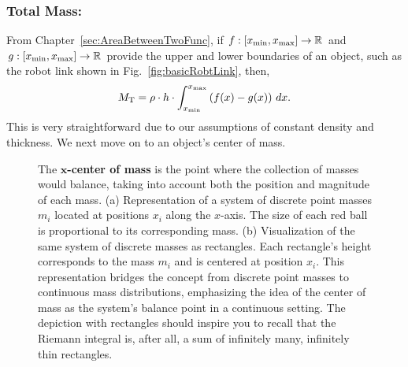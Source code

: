 \subsubsection{Total Mass:} From Chapter~\ref{sec:AreaBetweenTwoFunc}, if $f:[x_{\rm min}, x_{\rm max}] \to \mathbb R$ and $g:[x_{\rm min}, x_{\rm max}] \to \mathbb R$ provide the upper and lower boundaries of an object, such as the robot link shown in Fig.~\ref{fig:basicRobtLink}, then, 
\begin{equation}
    M_{\rm T} = \rho \cdot h \cdot \int_{x_{\rm min}}^{x_{\rm max}} \left(f(x) - g(x) \right)\, dx.
\end{equation}
This is very straightforward due to our assumptions of constant density and thickness. We next move on to an object's center of mass. 

 \begin{figure}[htb]%
\centering
{}%
\hfill%
%

    \caption[]{The \textbf{$\bm{x}$-center of mass} is the point where the collection of masses would balance, taking into account both the position and magnitude of each mass. (a) Representation of a system of discrete point masses \( m_i \) located at positions \( x_i \) along the $x$-axis. The size of each red ball is proportional to its corresponding mass. (b) Visualization of the same system of discrete masses as rectangles. Each rectangle's height corresponds to the mass \( m_i \) and is centered at position \( x_i \). This representation bridges the concept from discrete point masses to continuous mass distributions, emphasizing the idea of the center of mass as the system's balance point in a continuous setting. The depiction with rectangles should inspire you to recall that the Riemann integral is, after all, a sum of infinitely many, infinitely thin rectangles.}
    \label{fig:centerOfMass1D}
\end{figure}

